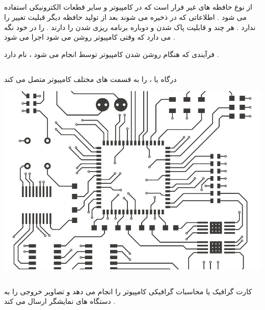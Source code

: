 \documentclass[12pt]{book}
\begin{document}
\subsection{}

از نوع حافظه های غیر فرار است که در کامپیوتر و سایر قطعات الکترونیکی استفاده می شود .
اطلاعاتی که در 
ذخیره می شوند بعد از تولید حافظه دیگر قبلیت تغییر را ندارد .
هر چند 
و
قابلیت پاک شدن و دوباره برنامه ریزی شدن را دارند .
را در خود نگه می دارد که وقتی کامپیوتر روشن می شود اجرا می شود .

فرآیندی که هنگام روشن شدن کامپیوتر توسط 
انجام می شود ، 
نام دارد .

\subsection{}

درگاه یا 
،
را به قسمت های مختلف کامپیوتر متصل می کند

\begin{center}
	\includegraphics[scale=0.4]{./printed-circuit-board-background-vector-13477596 (2).jpg}
\end{center}

\subsection{}

کارت گرافیک یا
محاسبات گرافیکی کامپیوتر را انجام می دهد و تصاویر خروجی را به دستگاه های نمایشگر ارسال می کند .
\end{document}

